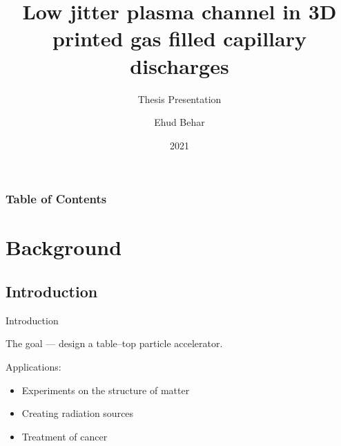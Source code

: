 \documentclass[]{beamer}
\title{Low jitter plasma channel in 3D printed gas filled capillary discharges}
\subtitle{Thesis Presentation}
\author{Ehud Behar}
\institute{Hebrew University of Jerusalem}
\date{2021}
\begin{document}
\frame{\titlepage}
\begin{frame}
\frametitle{Table of Contents}
\tableofcontents
\end{frame}

\section{Background}
\subsection{Introduction}
  \begin{frame}{Introduction}
  \begin{center}
    The goal --- design a table--top particle accelerator.
  \end{center}
    Applications:
    \begin{itemize}
        \item[\textbullet] Experiments on the structure of matter
        \item[\textbullet] Creating radiation sources
        \item[\textbullet] Treatment of cancer
    \end{itemize}
  \end{frame}
\end{document}
